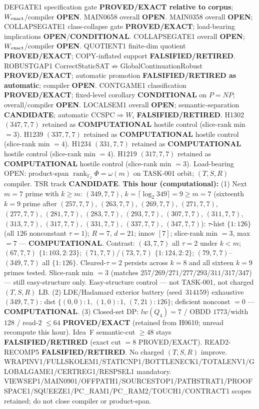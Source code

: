 \documentclass[11pt]{article}
\begin{document}
DEFGATE1 specification gate \textbf{PROVED/EXACT relative to corpus};
$W_{\rm exact}$/compiler \textbf{OPEN}.
MAIN0658 overall \textbf{OPEN}.
MAIN0358 overall \textbf{OPEN}; COLLAPSEGATE1 class-collapse gate \textbf{PROVED/EXACT};
load-bearing implications \textbf{OPEN}/\textbf{CONDITIONAL}.
COLLAPSEGATE1 overall \textbf{OPEN}; $W_{\rm exact}$/compiler \textbf{OPEN}.
QUOTIENT1 finite-dim quotient \textbf{PROVED/EXACT}; COPY-inflated support \textbf{FALSIFIED/RETIRED}.
ROBUSTGAP1 CorrectStaticSAT$\not\Rightarrow$GlobalContinuationRobust \textbf{PROVED/EXACT};
automatic promotion \textbf{FALSIFIED/RETIRED as automatic}; compiler \textbf{OPEN}.
CONTGAME1 classification \textbf{PROVED/EXACT}; fixed-level corollary \textbf{CONDITIONAL} on $P=NP$;
overall/compiler \textbf{OPEN}.
LOCALSEM1 overall \textbf{OPEN}; semantic-separation \textbf{CANDIDATE}; automatic CCSPC$\Rightarrow W_i$
\textbf{FALSIFIED/RETIRED}.
H1302 $(347,7,7)$ retained as \textbf{COMPUTATIONAL} hostile control (slice-rank min $=3$).
H1239 $(337,7,7)$ retained as \textbf{COMPUTATIONAL} hostile control (slice-rank min $=4$).
H1234 $(331,7,7)$ retained as \textbf{COMPUTATIONAL} hostile control (slice-rank min $=4$).
H1219 $(317,7,7)$ retained as \textbf{COMPUTATIONAL} hostile control (slice-rank min $=3$).
Load-bearing OPEN: product-span $\operatorname{rank}_{\mathbb F_2}\Phi=\omega(m)$ on TASK-001 orbit;
$(T,S,R)$ compiler. TSR track \textbf{CANDIDATE}.
\textbf{This hour (computational):}
(1) Next $m{=}7$ prime with $k{\ge}m$: $(349,7,7)$, $k{=}\lceil\log_2 349\rceil=9{\ge}m{=}7$
(sixteenth $k{=}9$ prime after $(257,7,7)$, $(263,7,7)$, $(269,7,7)$, $(271,7,7)$, $(277,7,7)$, $(281,7,7)$, $(283,7,7)$, $(293,7,7)$, $(307,7,7)$, $(311,7,7)$, $(313,7,7)$, $(317,7,7)$, $(331,7,7)$, $(337,7,7)$, $(347,7,7)$):
$\tau$-hist $\{1{:}126\}$ (all $126$ nonconstant $\tau{=}1$); $R{=}7$, $d{=}21$; innov $[7]$;
slice-rank min $=3$, max $=7$ --- \textbf{COMPUTATIONAL}.
Contrast: $(43,7,7)$ all $\tau{=}2$ under $k{\lt}m$; $(67,7,7)$ $\{1{:}103,2{:}23\}$;
$(71,7,7)$/$(73,7,7)$ $\{1{:}124,2{:}2\}$; $(79,7,7)$--$(349,7,7)$ all $\{1{:}126\}$.
Cleared-$\tau{=}2$ persists across $k{=}8$ and all sixteen $k{=}9$ primes tested.
Slice-rank min $=3$ (matches $257$/$269$/$271$/$277$/$293$/$311$/$317$/$347$) --- still easy-structure only.
Easy-structure control --- not TASK-001, not charged $(T,S,R)$ LB.
(2) LDE/Hadamard exterior battery (seed~$314159$) exhaustive $(349,7,7)$:
dist $\{(0,0){:}1,\,(1,0){:}1,\,(7,21){:}126\}$; deficient nonconst $=0$ --- \textbf{COMPUTATIONAL}.
(3) Closed-set DP: $lw(Q_4)=7$ / OBDD $1773$/width $128$ / read-$2$ $\le64$
\textbf{PROVED/EXACT} (retained from H0610; unread recompute this hour).
Idea~F semantic-cut $\ge48$ stays \textbf{FALSIFIED/RETIRED} (exact cut $=8$ PROVED/EXACT).
READ2-RECOMP5 \textbf{FALSIFIED/RETIRED}. No charged $(T,S,R)$ improve.
WRAPINV1/FULLSKOLEM1/STATICNP1/BOTTLENECK1/TOTALENV1/GLOBALGAME1/CERTREG1/RESPSEL1 mandatory.
VIEWSEP1/MAIN0901/OFFPATH1/SOURCESTOP1/PATHSTRAT1/PROOFSPACE1/SQUEEZE1/PC\_RAM1/PC\_RAM2/TOUCH1/CONTRACT1 scopes retained; do not close compiler or product-span.
\end{document}
